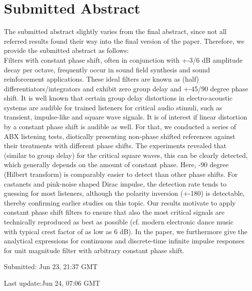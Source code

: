 \documentclass[conference,10pt]{IEEEtran}
\def\NewL{\\\noindent\hspace*{5mm}}
\begin{document}
\section*{Submitted Abstract}
The submitted abstract slightly varies from the final abstract, since not all
referred results found their way into the final version of the paper.
Therefore, we provide the submitted abstract as follows:
%
\NewL Filters with constant phase shift, often in conjunction with +-3/6 dB
amplitude decay per octave, frequently occur in sound field synthesis and
sound reinforcement applications.
%
These ideal filters are known as (half) differentiators/integrators and exhibit
zero group delay and +-45/90 degree phase shift.
%
It is well known that certain group delay distortions in electro-acoustic
systems are audible for trained listeners for critical audio stimuli, such as
transient, impulse-like and square wave signals.
%
It is of interest if linear distortion by a constant phase shift is audible
as well.
%
For that, we conducted a series of ABX listening tests, diotically presenting
non-phase shifted references against their treatments with different phase
shifts.
%
The experiments revealed that (similar to group delay) for the critical
square waves, this can be clearly detected, which generally depends on the
amount of constant phase.
%
Here, -90 degree (Hilbert transform) is comparably easier to detect than other
phase shifts. For castanets and pink-noise shaped Dirac impulse, the detection
rate tends to guessing for most listeners, although the polarity inversion
(+-180) is detectable, thereby confirming earlier studies on this topic.
%
Our results motivate to apply constant phase shift filters to ensure that also
the most critical signals are technically reproduced  as best as possible
(cf. modern electronic dance music with typical crest factor of as low as 6 dB).
%
In the paper, we furthermore give the analytical expressions for continuous
and discrete-time infinite impulse responses for unit magnitude filter with
arbitrary constant phase shift.

Submitted: Jun 23, 21:37 GMT

Last update:Jun 24, 07:06 GMT
\end{document}
